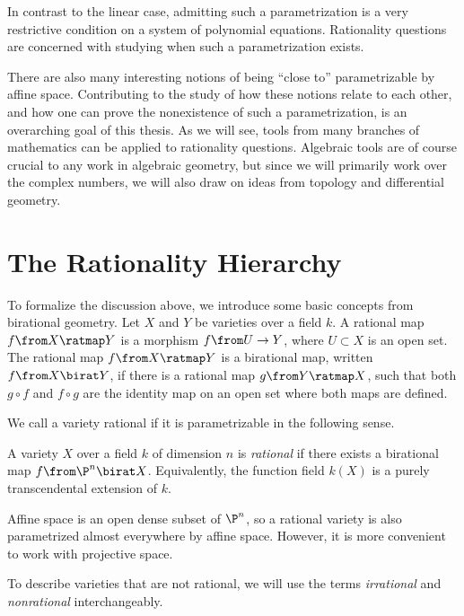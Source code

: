 In contrast to the linear case, admitting such a parametrization is a very restrictive condition on a system of polynomial equations. Rationality questions are concerned with studying when such a parametrization exists. 

There are also many interesting notions of being ``close to'' parametrizable by affine space. Contributing to the study of how these notions relate to each other, and how one can prove the nonexistence of such a parametrization, is an overarching goal of this thesis. As we will see, tools from many branches of mathematics can be applied to rationality questions. Algebraic tools are of course crucial to any work in algebraic geometry, but since we will primarily work over the complex numbers, we will also draw on ideas from topology and differential geometry.

\section{The Rationality Hierarchy}
To formalize the discussion above, we introduce some basic concepts from birational geometry. Let $X$ and $Y$ be varieties over a field $k$. A rational map $f \from X \ratmap Y$ is a morphism $f \from U \to Y$, where $U \subset X$ is an open set. The rational map $f \from X \ratmap Y$ is a birational map, written $f \from X \birat Y$, if there is a rational map $g \from Y \ratmap X$, such that both $g \circ f$ and $f \circ g$ are the identity map on an open set where both maps are defined.

We call a variety rational if it is parametrizable in the following sense.
\begin{definition}
	\label{def:Rational}
	A variety $X$ over a field $k$ of dimension $n$ is \emph{rational} if there exists a birational map $f \from \P^n \birat X$. Equivalently, the function field $k(X)$ is a purely transcendental extension of $k$.
\end{definition}
Affine space is an open dense subset of $\P^n$, so a rational variety is also parametrized almost everywhere by affine space. However, it is more convenient to work with projective space.

To describe varieties that are not rational, we will use the terms \emph{irrational} and \emph{nonrational} interchangeably.

